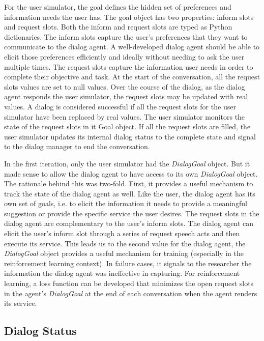 For the user simulator, the goal defines the hidden set of preferences and information needs the user has. The goal object has two properties: inform slots and request slots. Both the inform and request slots are typed as Python dictionaries. The inform slots capture the user's preferences that they want to communicate to the dialog agent. A well-developed dialog agent should be able to elicit those preferences efficiently and ideally without needing to ask the user multiple times. The request slots capture the information user needs in order to complete their objective and task. At the start of the conversation, all the request slots values are set to null values. Over the course of the dialog, as the dialog agent responds the user simulator, the request slots may be updated with real values. A dialog is considered successful if all the request slots for the user simulator have been replaced by real values. The user simulator monitors the state of the request slots in it Goal object. If all the request slots are filled, the user simulator updates its internal dialog status to the complete state and signal to the dialog manager to end the conversation. 

In the first iteration, only the user simulator had the \textit{DialogGoal} object. But it made sense to allow the dialog agent to have access to its own \textit{DialogGoal} object. The rationale behind this was two-fold. First, it provides a useful mechanism to track the state of the dialog agent as well. Like the user, the dialog agent has its own set of goals, i.e. to elicit the information it needs to provide a meaningful suggestion or provide the specific service the user desires. The request slots in the dialog agent are complementary to the user's inform slots. The dialog agent can elicit the user's inform slot through a series of request speech acts and then execute its service. This leads us to the second value for the dialog agent, the \textit{DialogGoal} object provides a useful mechanism for training (especially in the reinforcement learning context). In failure cases, it signals to the researcher the information the dialog agent was ineffective in capturing. For reinforcement learning, a loss function can be developed that minimizes the open request slots in the agent's \textit{DialogGoal} at the end of each conversation when the agent renders its service. 


\subsection{Dialog Status}

